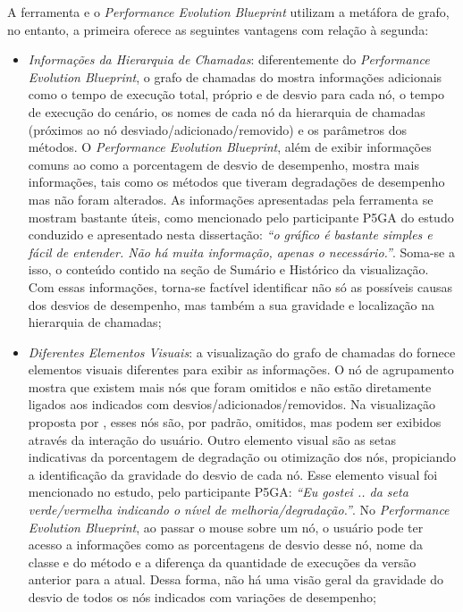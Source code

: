 A ferramenta {\textit{\toolName}} e o \textit{Performance Evolution Blueprint} utilizam a metáfora de grafo, no entanto, a primeira oferece as seguintes vantagens com relação à segunda:
\begin{itemize}
   \item \textit{Informações da Hierarquia de Chamadas}: diferentemente do \textit{Performance Evolution Blueprint}, o grafo de chamadas do {\textit{\toolName}} mostra informações adicionais como o tempo de execução total, próprio e de desvio para cada nó, o tempo de execução do cenário, os nomes de cada nó da hierarquia de chamadas (próximos ao nó desviado/adicionado/removido) e os parâmetros dos métodos. O \textit{Performance Evolution Blueprint}, além de exibir informações comuns ao {\textit{\toolName}} como a porcentagem de desvio de desempenho, mostra mais informações, tais como os métodos que tiveram degradações de desempenho mas não foram alterados. As informações apresentadas pela ferramenta {\textit{\toolName}} se mostram bastante úteis, como mencionado pelo participante P5GA do estudo conduzido e apresentado nesta dissertação: \textit{``o gráfico é bastante simples e fácil de entender. Não há muita informação, apenas o necessário.''}. Soma-se a isso, o conteúdo contido na seção de Sumário e Histórico da visualização. Com essas informações, torna-se factível identificar não só as possíveis causas dos desvios de desempenho, mas também a sua gravidade e localização na hierarquia de chamadas;
   \item \textit{Diferentes Elementos Visuais}: a visualização do grafo de chamadas do {\textit{\toolName}} fornece elementos visuais diferentes para exibir as informações. O nó de agrupamento mostra que existem mais nós que foram omitidos e não estão diretamente ligados aos indicados com desvios/adicionados/removidos. Na visualização proposta por \citeauthor{SandovalAlcocer2013}, esses nós são, por padrão, omitidos, mas podem ser exibidos através da interação do usuário. Outro elemento visual são as setas indicativas da porcentagem de degradação ou otimização dos nós, propiciando a identificação da gravidade do desvio de cada nó. Esse elemento visual foi mencionado no estudo, pelo participante P5GA: \textit{``Eu gostei .. da seta verde/vermelha indicando o nível de melhoria/degradação.''}. No \textit{Performance Evolution Blueprint}, ao passar o mouse sobre um nó, o usuário pode ter acesso a informações como as porcentagens de desvio desse nó, nome da classe e do método e a diferença da quantidade de execuções da versão anterior para a atual. Dessa forma, não há uma visão geral da gravidade do desvio de todos os nós indicados com variações de desempenho;

\end{itemize}
